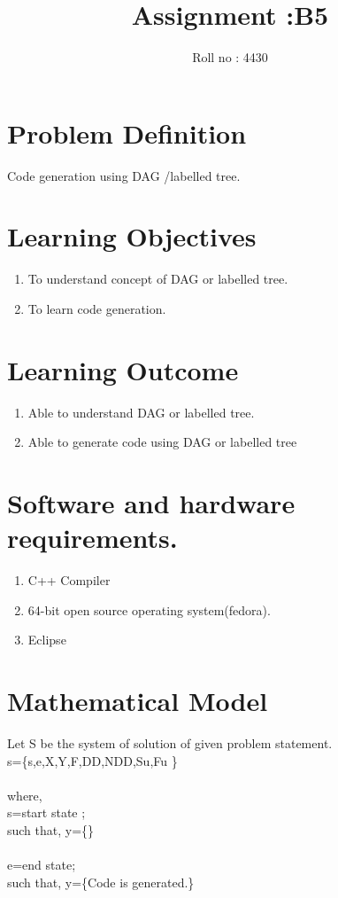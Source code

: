 \documentclass[12pt]{article}
\title{Assignment :B5}
\author{Roll no : 4430}
\date{}
\begin{document}
  \maketitle
  
\section{Problem Definition}
Code generation using DAG /labelled tree.


\section{Learning Objectives}

\begin{enumerate}
\item To understand concept of DAG or labelled tree.
\item To learn code generation.
\end{enumerate}

\section{Learning Outcome}
\begin{enumerate}
\item Able to understand DAG or labelled tree.
\item Able to generate code using DAG or labelled tree
\end{enumerate}


\section{Software and hardware requirements.}
\begin{enumerate}
\item C++ Compiler
\item 64-bit open source operating system(fedora).
\item Eclipse
\end{enumerate}  

\section{Mathematical Model}
Let S be the system of solution of given problem statement.\\
s=\{s,e,X,Y,F,DD,NDD,Su,Fu \}\\\\
where,\\
s=start state ;\\
such that, y=\{\}\\\\
e=end state;\\
such that, y=\{Code is generated.\}\\
\end{document}

